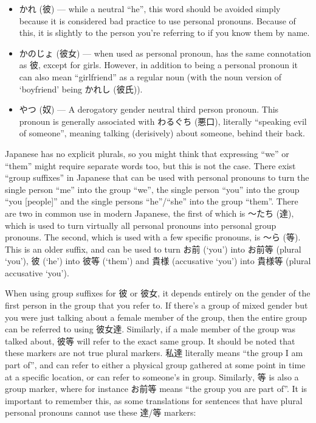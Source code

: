 \documentclass[11pt, b5paper, twoside, openright, onecolumn]{book}
\makeatletter
\newcommand*{\rubystack}[2]{{\relscale{0.5}%
  \begin{tabular}[b]{@{}c@{}}%
    {#1}\\%
   {\textscale{2}{#2}}%
  \end{tabular}}%
}
\DeclareRobustCommand*{\ruby}[2]{%
  \mbox{%
    \setlength{\parskip}{0ex}%
    \BeginAccSupp{method=pdfstringdef,ActualText={#1}}%
      \rubystack{\phantom{#2}}{#1}%
      \llap{%
        \rubystack{#2}{\phantom{#1}}%
      }%
    \EndAccSupp{}%
  }%
}
\renewcommand*{\ruby}[2]{#2 (#1)}%
\makeatother
\begin{document}
\begin{itemize}
\item {}\ruby{彼}{かれ} — while a neutral “he”‚ this word should be avoided simply because it is considered bad practice to use personal pronouns. Because of this‚ it is slightly  to the person you’re referring to if you know them by name.
\item {}\ruby{彼女}{かのじょ} — when used as personal pronoun‚ has the same connotation as 彼‚ except for girls. However‚ in addition to being a personal pronoun it can also mean “girlfriend” as a regular noun (with the noun version of ‘boyfriend’ being \ruby{彼氏}{かれし}).
\item {}\ruby{奴}{やつ} — A derogatory gender neutral third person pronoun. This pronoun is generally associated with \ruby{悪口}{わるぐち}‚ literally “speaking evil of someone”‚ meaning talking (derisively) about someone‚ behind their back.
\end{itemize}

Japanese has no explicit plurals‚ so you might think that expressing “we” or “them” might require separate words too‚ but this is not the case. There exist “group suffixes” in Japanese that can be used with personal pronouns to turn the single person “me” into the group “we”‚ the single person “you” into the group “you [people]” and the single persons “he”/“she” into the group “them”. There are two in common use in modern Japanese‚ the first of which is ～\ruby{達}{たち}‚ which is used to turn virtually all personal pronouns into personal group pronouns. The second‚ which is used with a few specific pronouns‚ is ～\ruby{等}{ら}. This is an older suffix‚ and can be used to turn お前 (‘you’) into お前等 (plural ‘you’)‚ 彼 (‘he’) into 彼等 (‘them’) and 貴様 (accusative ‘you’) into 貴様等 (plural accusative ‘you’).

When using group suffixes for 彼 or 彼女‚ it depends entirely on the gender of the first person in the group that you refer to. If there’s a group of mixed gender but you were just talking about a female member of the group‚ then the entire group can be referred to using 彼女達. Similarly‚ if a male member of the group was talked about‚ 彼等 will refer to the exact same group. It should be noted that these markers are not true plural markers. 私達 literally means “the group I am part of”‚ and can refer to either a physical group gathered at some point in time at a specific location‚ or can refer to someone’s in group. Similarly‚ 等 is also a group marker‚ where for instance お前等 means “the group you are part of”. It is important to remember this‚ as some translations for sentences that have plural personal pronouns cannot use these 達/等 markers:
\end{document}

